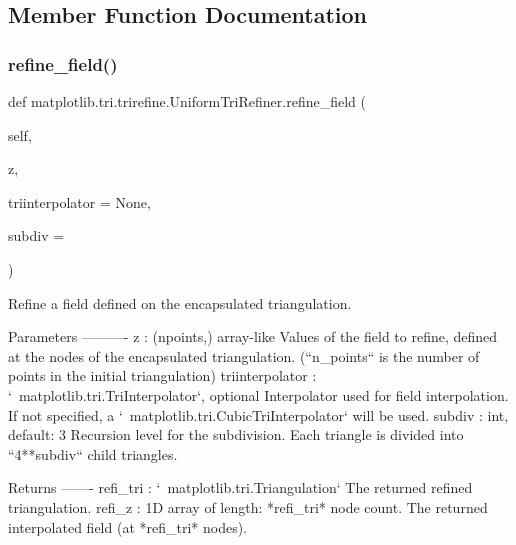 \subsection{Member Function Documentation}
\mbox{\label{classmatplotlib_1_1tri_1_1trirefine_1_1UniformTriRefiner_a6c9a6d3f49d0d5cec563208e19a5de08}} 
\subsubsection{\texorpdfstring{refine\+\_\+field()}{refine\_field()}}
{\footnotesize\ttfamily def matplotlib.\+tri.\+trirefine.\+Uniform\+Tri\+Refiner.\+refine\+\_\+field (\begin{DoxyParamCaption}\item[{}]{self,  }\item[{}]{z,  }\item[{}]{triinterpolator = {\ttfamily None},  }\item[{}]{subdiv = {} }\end{DoxyParamCaption})}

\begin{DoxyVerb}Refine a field defined on the encapsulated triangulation.

Parameters
----------
z : (npoints,) array-like
    Values of the field to refine, defined at the nodes of the
    encapsulated triangulation. (``n_points`` is the number of points
    in the initial triangulation)
triinterpolator : `~matplotlib.tri.TriInterpolator`, optional
    Interpolator used for field interpolation. If not specified,
    a `~matplotlib.tri.CubicTriInterpolator` will be used.
subdiv : int, default: 3
    Recursion level for the subdivision.
    Each triangle is divided into ``4**subdiv`` child triangles.

Returns
-------
refi_tri : `~matplotlib.tri.Triangulation`
     The returned refined triangulation.
refi_z : 1D array of length: *refi_tri* node count.
     The returned interpolated field (at *refi_tri* nodes).
\end{DoxyVerb}
 \mbox{\label{classmatplotlib_1_1tri_1_1trirefine_1_1UniformTriRefiner_afae7d843d5e02cefdc3f35bee6ef090e}} 
